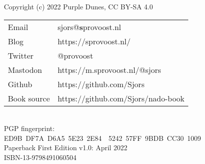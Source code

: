 \newpage
{\setlength{\parindent}{0cm}
\begin{vplace}
Copyright (c) 2022 Purple Dunes, CC BY-SA 4.0\\

\begin{tabular}{@{} l l }
Email & sjors@\textbf{s}provoost.nl \\
Blog & https://sprovoost.nl/ \\
Twitter & @provoost \\
Mastodon & https://m.sprovoost.nl/@sjors \\
Github & https://github.com/Sjors \\
Book source & https://github.com/Sjors/nado-book \\
\end{tabular}
\\

PGP fingerprint:\\
ED9B DF7A D6A5 5E23 2E84  5242 57FF 9BDB CC30 1009\\

Paperback First Edition v1.0: April 2022\\

ISBN-13-9798491060504\\
\end{vplace}
}
